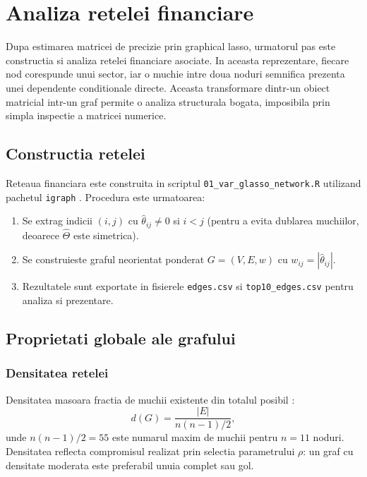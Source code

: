 \chapter{Analiza retelei financiare}

Dupa estimarea matricei de precizie prin graphical lasso, urmatorul pas este
constructia si analiza retelei financiare asociate. In aceasta reprezentare,
fiecare nod corespunde unui sector, iar o muchie intre doua noduri semnifica
prezenta unei dependente conditionale directe. Aceasta transformare
dintr-un obiect matricial intr-un graf permite o analiza structurala bogata,
imposibila prin simpla inspectie a matricei numerice.

\section{Constructia retelei}

Reteaua financiara este construita in scriptul \texttt{01\_var\_glasso\_network.R}
utilizand pachetul \texttt{igraph} \citep{csardi2006}. Procedura este urmatoarea:

\begin{enumerate}
    \item Se extrag indicii $(i,j)$ cu $\hat{\theta}_{ij} \neq 0$ si $i < j$
    (pentru a evita dublarea muchiilor, deoarece $\hat{\Theta}$ este simetrica).
    \item Se construieste graful neorientat ponderat $G = (V, E, w)$ cu
    $w_{ij} = |\hat{\theta}_{ij}|$.
    \item Rezultatele sunt exportate in fisierele \texttt{edges.csv} si
    \texttt{top10\_edges.csv} pentru analiza si prezentare.
\end{enumerate}

\section{Proprietati globale ale grafului}

\subsection{Densitatea retelei}

Densitatea masoara fractia de muchii existente din totalul posibil
\citep{newman2010}:
\begin{equation}
    d(G) = \frac{|E|}{n(n-1)/2},
    \label{eq:density}
\end{equation}
unde $n(n-1)/2 = 55$ este numarul maxim de muchii pentru $n = 11$ noduri.
Densitatea reflecta compromisul realizat prin selectia parametrului $\rho$:
un graf cu densitate moderata este preferabil unuia complet sau gol.

